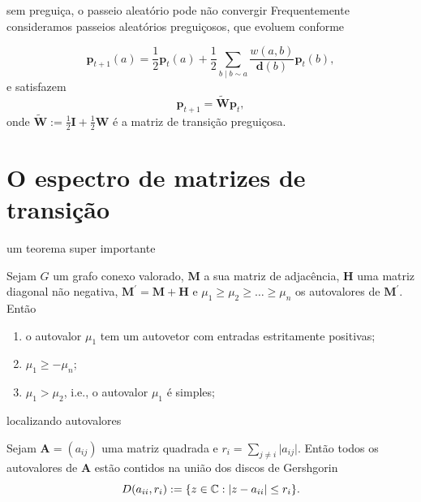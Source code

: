 \documentclass{beamer}
\begin{document}
\begin{frame}{sem preguiça, o passeio aleatório pode não convergir}
    Frequentemente consideramos \alert{passeios aleatórios preguiçosos}, que evoluem conforme

    \begin{equation*}
        \mathbf{p}_{t+1}(a) = \frac{1}{2}\mathbf{p}_t(a) + \frac{1}{2}\sum_{b \mid b \sim a} \frac{w(a, b)}{\mathbf{d}(b)} \mathbf{p}_t(b),
    \end{equation*}\pause e satisfazem
    \begin{equation*}
        \mathbf{p}_{t+1} = \widetilde{\mathbf{W}} \mathbf{p}_t,
    \end{equation*} onde \(\widetilde{\mathbf{W}} := \frac{1}{2}\mathbf{I} + \frac{1}{2}\mathbf{W}\) é a \alert{matriz de transição preguiçosa}.
\end{frame}

\section{O espectro de matrizes de transição}

\begin{frame}{um teorema super importante}
    \begin{thm} Sejam \(G\) um grafo conexo valorado, \(\mathbf{M}\) a sua matriz de adjacência, \(\mathbf{H}\) uma matriz diagonal não negativa, \(\mathbf{M}^{\prime} = \mathbf{M} + \mathbf{H}\) e \(\mu_1 \geq \mu_2 \geq \ldots \geq \mu_n\) os autovalores de \(\mathbf{M}^{\prime}\). Então
        \begin{enumerate}
            \item o autovalor \(\mu_1\) tem um autovetor com entradas estritamente positivas;
            \item \(\mu_1 \geq -\mu_n\);
            \item \(\mu_1 > \mu_2\), i.e., o autovalor \(\mu_1\) é simples;
        \end{enumerate}
    \end{thm}
\end{frame}

\begin{frame}{localizando autovalores}
    \begin{thm}[Gershgorin]
        Sejam \(\mathbf{A} = (a_{ij})\) uma matriz quadrada e \(r_i = \sum_{j \neq i} \vert a_{ij} \vert\). Então todos os autovalores de \(\mathbf{A}\) estão contidos na união dos \alert{discos de Gershgorin}
        \begin{equation*}
            D(a_{ii}, r_i) := \{ z \in \mathbb{C} : \vert z - a_{ii} \vert \leq r_i\}.
        \end{equation*}
    \end{thm}
\end{frame}
\end{document}
